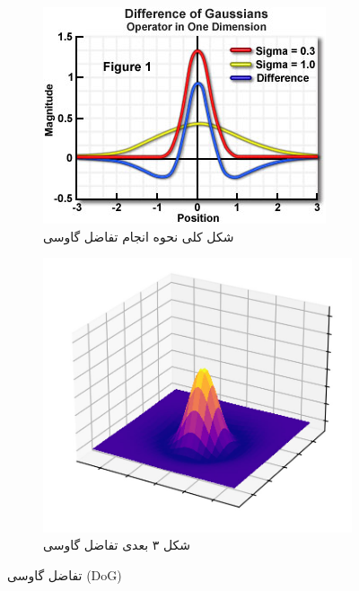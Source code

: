         \begin{figure}[!ht]
            \centering
            \begin{subfigure}[b]{0.4\textwidth}
                \includegraphics[width=\textwidth]{images/DoG-filter.jpg}
                \caption{شکل کلی نحوه انجام تفاضل گاوسی}
                \label{fig:part1-DoG-filter}
            \end{subfigure}
            \hfill %
            \begin{subfigure}[b]{0.4\textwidth}
                \includegraphics[width=\textwidth]{images/DoG-3d.jpg}
                \caption{شکل ۳ بعدی تفاضل گاوسی}
                \label{fig:part1-DoG-3d}
            \end{subfigure}
            \caption{ تفاضل گاوسی (DoG)}
            \label{fig:part1-DoG}
        \end{figure}
